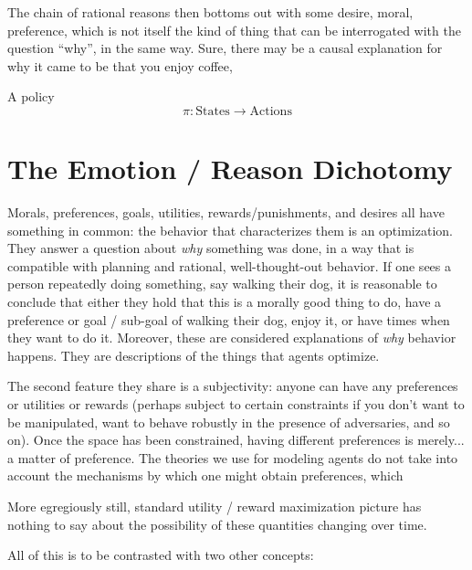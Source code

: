 \documentclass{book}
\begin{document}
	The chain of rational reasons then bottoms out with some desire, moral, preference, which is not itself the kind of thing that can be interrogated with the question ``why'', in the same way. Sure, there may be a causal explanation for why it came to be that you enjoy coffee, 
	
	
			
	A policy
	\[ \pi: \mathrm{States} \to \mathrm{Actions} \]
	
	
	
	
	\section{The Emotion / Reason Dichotomy}
	Morals, preferences, goals, utilities, rewards/punishments, and desires all have something in common: the behavior that characterizes them is an optimization. They answer a question about \emph{why} something was done, in a way that is compatible with planning and rational, well-thought-out behavior. If one sees a person repeatedly doing something, say walking their dog, it is reasonable to conclude that either they hold that this is a morally good thing to do, have a preference or goal / sub-goal of walking their dog, enjoy it, or have times when they want to do it. Moreover, these are considered explanations of \emph{why} behavior happens. They are descriptions of the things that agents optimize.
	
	The second feature they share is a subjectivity: anyone can have any preferences or utilities or rewards (perhaps subject to certain constraints if you don't want to be manipulated, want to behave robustly in the presence of adversaries, and so on). Once the space has been constrained, having different preferences is merely... a matter of preference. The theories we use for modeling agents do not take into account the mechanisms by which one might obtain preferences, which 
	
	More egregiously still, standard utility / reward maximization picture has nothing to say about the possibility of these quantities changing over time.
	
	
	
	All of this is to be contrasted with two other concepts:
\end{document}
